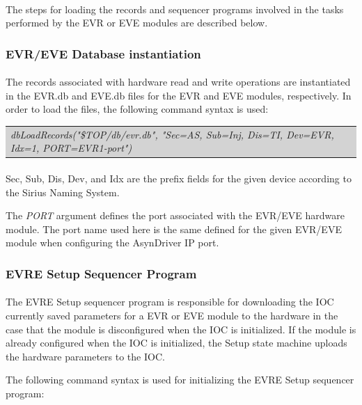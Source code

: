 \documentclass[openany]{article}
\begin{document}
		\paragraph{} The steps for loading the records and sequencer programs involved in the tasks performed by the EVR or EVE modules are described below.

		\subsubsection{EVR/EVE Database instantiation}

			\paragraph{} The records associated with hardware read and write operations are instantiated in the EVR.db and EVE.db files for the EVR and EVE modules, respectively. In order to load the files, the following command syntax is used:

			\bigskip
			\colorbox{lightgray}{
				\begin{tabularx}{0.9\textwidth}{X}
				\emph{dbLoadRecords("\${TOP}/db/evr.db", "Sec=AS, Sub=Inj, Dis=TI, Dev=EVR, Idx=1, PORT=EVR1-port")}
				\end{tabularx}
			}


			\paragraph{} Sec, Sub, Dis, Dev, and Idx are the prefix fields for the given device according to the Sirius Naming System.
			\par The \emph{PORT} argument defines the port associated with the EVR/EVE hardware module. The port name used here is the same defined for the given EVR/EVE module when configuring the AsynDriver IP port.

		\subsubsection{EVRE Setup Sequencer Program}

			\paragraph{} The EVRE Setup sequencer program is responsible for downloading the IOC currently saved parameters for a EVR or EVE module to the hardware in the case that the module is disconfigured when the IOC is initialized. If the module is already configured when the IOC is initialized, the Setup state machine uploads the hardware parameters to the IOC.
			\par The following command syntax is used for initializing the EVRE Setup sequencer program:
\end{document}
